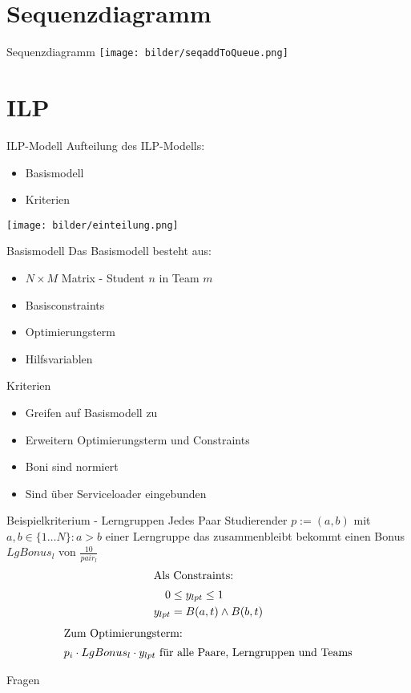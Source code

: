 \documentclass[18pt]{beamer}
\begin{document}
\section{Sequenzdiagramm} %
\begin{frame}{Sequenzdiagramm}
\texttt{[image: bilder/seqaddToQueue.png]}
\end{frame}

\section{ILP}
\begin{frame}{ILP-Modell}
Aufteilung des ILP-Modells:
\begin{itemize}
  \item Basismodell
  \item Kriterien
\end{itemize}
\texttt{[image: bilder/einteilung.png]}
\end{frame}

\begin{frame}{Basismodell}
Das Basismodell besteht aus:
\begin{itemize}
  \item $N \times M$ Matrix - Student $n$ in Team $m$
  \item Basisconstraints 
  \item Optimierungsterm
  \item Hilfsvariablen
\end{itemize}
\end{frame}

\begin{frame}{Kriterien}
\begin{itemize}
  \item Greifen auf Basismodell zu
  \item Erweitern Optimierungsterm und Constraints
  \item Boni sind normiert
  \item Sind über Serviceloader eingebunden
\end{itemize}
\end{frame}

\begin{frame}{Beispielkriterium - Lerngruppen} %
Jedes Paar Studierender $p:= (a,b)$ mit $a,b \in \{ 1\ldots N\}: a > b$
einer Lerngruppe das zusammenbleibt bekommt einen Bonus $LgBonus_l$ von
$\frac{10}{pair_l}$
\begin{align*}
\intertext{Als Constraints: }
0 &\le y_{lpt} \le 1  \\
y_{lpt} &= B(a,t) \wedge B(b,t)
\end{align*}
\begin{align*}
\intertext{Zum Optimierungsterm: } 
p_i \cdot LgBonus_l \cdot y_{lpt} \text{ für alle Paare, Lerngruppen und Teams}
\end{align*} 

\end{frame}

\appendix
\beginbackup

\begin{frame}{Fragen}
\printbibliography
\end{frame}

\backupend
\end{document}
